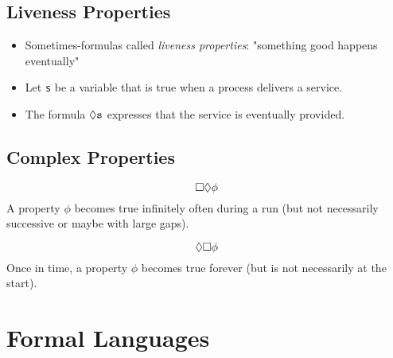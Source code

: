 		\subsection{Liveness Properties}
			\begin{itemize}
				\item Sometimes-formulas called \textit{liveness properties}: "something good happens eventually"
				\item Let \texttt{s} be a variable that is true when a process delivers a service.
				\item The formula \( \lozenge \texttt{s} \) expresses that the service is eventually provided.
			\end{itemize}

		\subsection{Complex Properties}
			\begin{equation*}
				\square \lozenge \phi
			\end{equation*}
			A property \(\phi\) becomes true infinitely often during a run (but not necessarily successive or maybe with large gaps).

			\begin{equation*}
				\lozenge \square \phi
			\end{equation*}
			Once in time, a property \(\phi\) becomes true forever (but is not necessarily at the start).

	\section{Formal Languages}


